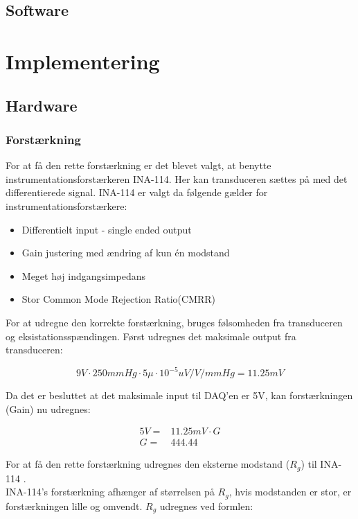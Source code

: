 \subsection{Software}

\section{Implementering}
\subsection{Hardware}
\subsubsection{Forstærkning}
For at få den rette forstærkning er det blevet valgt, at benytte instrumentationsforstærkeren INA-114. Her kan transduceren sættes på med det differentierede signal. INA-114 er valgt da følgende gælder\cite{Instrumentation} for instrumentationsforstærkere: 
\begin{itemize}
	\item Differentielt input - single ended output 
	\item Gain justering med ændring af kun én modstand 
	\item Meget høj indgangsimpedans 
	\item Stor Common Mode Rejection Ratio(CMRR)
\end{itemize}
For at udregne den korrekte forstærkning, bruges følsomheden fra transduceren og eksistationsspændingen.
Først udregnes det maksimale output fra transduceren:   
\begin{ceqn}
\begin{equation}
9V\cdot 250mmHg \cdot 5\mu\cdot 10^{-5} uV/V/mmHg  = 11.25mV
\end{equation} 
\end{ceqn}
Da det er besluttet at det maksimale input til DAQ'en \cite{DSB} er 5V, kan forstærkningen (Gain) nu udregnes:
\begin{ceqn}
\begin{equation}
\begin{split}
5V=& 11.25mV \cdot G \\
G =& 444.44
\end{split}
\end{equation}
\end{ceqn}
For at få den rette forstærkning udregnes den eksterne modstand ($ R_g $) til INA-114 \cite{INA}.\\ 
INA-114's forstærkning afhænger af størrelsen på $ R_g $, hvis modstanden er stor, er forstærkningen lille og omvendt.  $ R_g $ udregnes ved formlen: 
